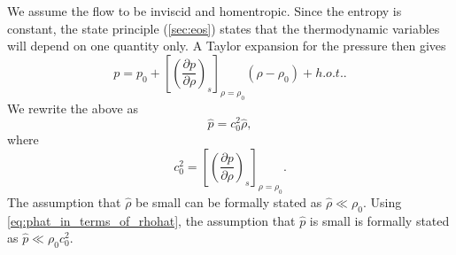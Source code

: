 \documentclass[oneside,a4paper,11pt]{report}
\begin{document}
We assume the flow to be inviscid and homentropic. Since the entropy is constant, the state principle (\cref{sec:eos}) states that the thermodynamic variables will depend on one quantity only. A Taylor expansion for the pressure then gives
\begin{equation}
    p = p_0 + \left [ \left(\frac{\partial p}{\partial \rho} \right)_s \right]_{\rho = \rho_0} (\rho - \rho_0) + h.o.t..
\end{equation}
We rewrite the above as
\begin{equation}
\label{eq:phat_in_terms_of_rhohat}
    \hat{p} = c^2_0 \hat{\rho},
\end{equation}
where
\begin{equation}
\label{eq:sos_ref}
    c^2_0 = \left [ \left(\frac{\partial p}{\partial \rho} \right)_s \right]_{\rho = \rho_0}.
\end{equation}
The assumption that $\hat{\rho}$ be small can be formally stated as $\hat{\rho} \ll \rho_0$. Using \cref{eq:phat_in_terms_of_rhohat}, the assumption that $\hat{p}$ is small is formally stated as $\hat{p} \ll \rho_0 c_0^2$.
\end{document}
